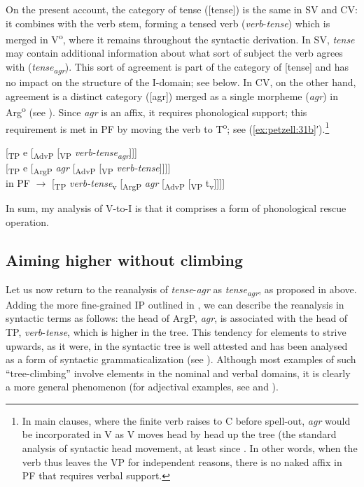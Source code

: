 \documentclass[output=paper,colorlinks,citecolor=brown,draft,draftmode]{langscibook}
\begin{document}
On the present account, the category of tense ([tense]) is the same in SV and CV: it combines with the verb stem, forming a tensed verb (\textit{verb}-\textit{tense}) which is merged in V\textsuperscript{o}, where it remains throughout the syntactic derivation. In SV, \textit{tense} may contain additional information about what sort of subject the verb agrees with (\textit{tense\textsubscript{agr}}). This sort of agreement is part of the category of [tense] and has no impact on the structure of the I-domain; see  below. In CV, on the other hand, agreement is a distinct category ([agr]) merged as a single morpheme (\textit{agr}) in Arg\textsuperscript{o} (see ). Since \textit{agr} is an affix, it requires phonological support; this requirement is met in PF by moving the verb to T\textsuperscript{o}; see (\ref{ex:petzell:31b}′).\footnote{In
    main clauses, where the finite verb raises to C before spell-out, \textit{agr} would be incorporated in V as V moves head by head up the tree (the standard analysis of syntactic head movement, at least since \citet{Chomsky2001}. In other words, when the verb thus leaves the VP for independent reasons, there is no naked affix in PF that requires verbal support.
}


\ea\label{ex:petzell:31}
\ea\label{ex:petzell:31a}  [\textsubscript{TP} e [\textsubscript{AdvP} [\textsubscript{VP} \textit{verb-tense\textsubscript{agr}}]]]\\
\ex\label{ex:petzell:31b}   [\textsubscript{TP} e [\textsubscript{ArgP} \textit{agr} [\textsubscript{AdvP} [\textsubscript{VP} \textit{verb-tense}]]]]  \\
  in PF $\to$ [\textsubscript{TP} \textit{verb-tense}\textsubscript{v} [\textsubscript{ArgP} \textit{agr} [\textsubscript{AdvP} [\textsubscript{VP} t\textsubscript{v}]]]]
\z
\z


In sum, my analysis of V-to-I is that it comprises a form of phonological rescue operation.


\subsection{Aiming higher without climbing}\label{sec:petzell:5.2}


Let us now return to the reanalysis of \textit{tense}-\textit{agr} as \textit{tense\textsubscript{agr}}, as proposed in  above. Adding the more fine-grained IP outlined in , we can describe the reanalysis in syntactic terms as follows: the head of ArgP, \textit{agr}, is associated with the head of TP, \textit{verb}-\textit{tense}, which is higher in the tree. This tendency for elements to strive upwards, as it were, in the syntactic tree is well attested and has been analysed as a form of syntactic grammaticalization (see \citealt{RobertsRoussou1999,RobertsRoussou2003}). Although most examples of such “tree-climbing” involve elements in the nominal and verbal domains, it is clearly a more general phenomenon (for adjectival examples, see \citealt{Oxford2017} and ).
\end{document}
